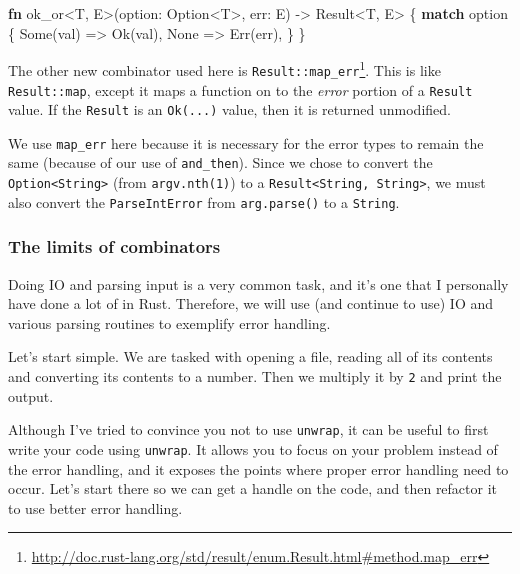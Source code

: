 \documentclass[a4paper,]{book}
\renewcommand*{\hypertarget}[3][\ar]{%
  \def\ar{#2}%
  \label{#1}%
  #3}
\newenvironment{Shaded}{\begin{snugshade}}{\end{snugshade}}
\newcommand{\KeywordTok}[1]{\textcolor[rgb]{0.13,0.29,0.53}{\textbf{{#1}}}}
\newcommand{\DataTypeTok}[1]{\textcolor[rgb]{0.13,0.29,0.53}{{#1}}}
\newcommand{\ConstantTok}[1]{\textcolor[rgb]{0.00,0.00,0.00}{{#1}}}
\newcommand{\NormalTok}[1]{{#1}}
\renewcommand{\href}[2]{#2\footnote{\url{#1}}}
\begin{document}
\begin{Shaded}
\begin{Highlighting}[]
\KeywordTok{fn} \NormalTok{ok_or<T, E>(option: }\DataTypeTok{Option}\NormalTok{<T>, err: E) -> }\DataTypeTok{Result}\NormalTok{<T, E> \{}
    \KeywordTok{match} \NormalTok{option \{}
        \ConstantTok{Some}\NormalTok{(val) => }\ConstantTok{Ok}\NormalTok{(val),}
        \ConstantTok{None} \NormalTok{=> }\ConstantTok{Err}\NormalTok{(err),}
    \NormalTok{\}}
\NormalTok{\}}
\end{Highlighting}
\end{Shaded}

The other new combinator used here is
\href{http://doc.rust-lang.org/std/result/enum.Result.html\#method.map_err}{\texttt{Result::map\_err}}.
This is like \texttt{Result::map}, except it maps a function on to the
\emph{error} portion of a \texttt{Result} value. If the \texttt{Result}
is an \texttt{Ok(...)} value, then it is returned unmodified.

We use \texttt{map\_err} here because it is necessary for the error
types to remain the same (because of our use of \texttt{and\_then}).
Since we chose to convert the
\texttt{Option\textless{}String\textgreater{}} (from
\texttt{argv.nth(1)}) to a
\texttt{Result\textless{}String,\ String\textgreater{}}, we must also
convert the \texttt{ParseIntError} from \texttt{arg.parse()} to a
\texttt{String}.

\hypertarget{the-limits-of-combinators}{\subsubsection{The limits of
combinators}\label{the-limits-of-combinators}}

Doing IO and parsing input is a very common task, and it's one that I
personally have done a lot of in Rust. Therefore, we will use (and
continue to use) IO and various parsing routines to exemplify error
handling.

Let's start simple. We are tasked with opening a file, reading all of
its contents and converting its contents to a number. Then we multiply
it by \texttt{2} and print the output.

Although I've tried to convince you not to use \texttt{unwrap}, it can
be useful to first write your code using \texttt{unwrap}. It allows you
to focus on your problem instead of the error handling, and it exposes
the points where proper error handling need to occur. Let's start there
so we can get a handle on the code, and then refactor it to use better
error handling.
\end{document}
